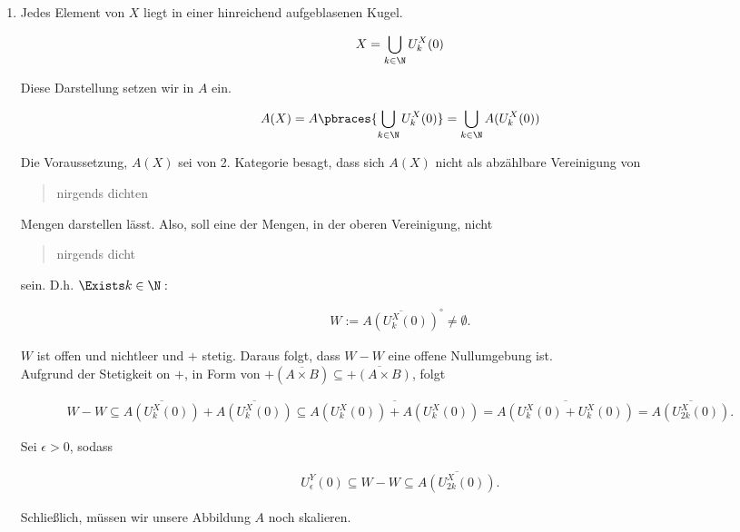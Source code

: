 \begin{solution}

\phantom{}

\begin{enumerate}[label = (\roman*)]

  \item
  Jedes Element von $X$ liegt in einer hinreichend aufgeblasenen Kugel.

  \begin{align*}
    X = \bigcup_{k \in \N} U_k^X(0)
  \end{align*}

  Diese Darstellung setzen wir in $A$ ein.

  \begin{align*}
    A(X)
    =
    A \pbraces
    {
      \bigcup_{k \in \N}
      U_k^X(0)
    }
    =
    \bigcup_{k \in \N}
    A(U_k^X(0))
  \end{align*}

  Die Voraussetzung, $A(X)$ sei von 2. Kategorie besagt, dass sich $A(X)$ nicht als abzählbare Vereinigung von \blockquote{nirgends dichten} Mengen darstellen lässt.
  Also, soll eine der Mengen, in der oberen Vereinigung, nicht \blockquote{nirgends dicht} sein.
  D.h. $\Exists k \in \N:$

  \begin{align*}
    W := \overline{A(U_k^X(0))}^\circ \neq \emptyset.
  \end{align*}

  $W$ ist offen und nichtleer und $+$ stetig.
  Daraus folgt, dass $W - W$ eine offene Nullumgebung ist. \\

  Aufgrund der Stetigkeit on $+$, in Form von $+(\overline{A \times B}) \subseteq \overline{+(A \times B)}$, folgt

  \begin{align*}
    W - W
    \subseteq
    \overline{A(U_k^X(0))} + \overline{A(U_k^X(0))}
    \subseteq
    \overline{A(U_k^X(0)) + A(U_k^X(0))}
    =
    \overline{A(U_k^X(0) + U_k^X(0))}
    =
    \overline{A(U_{2k}^X(0))}.
  \end{align*}

  Sei $\epsilon > 0$, sodass

  \begin{align*}
    U_{\epsilon}^Y(0)
    \subseteq
    W - W
    \subseteq
    \overline{A(U_{2k}^X(0))}.
  \end{align*}

  Schließlich, müssen wir unsere Abbildung $A$ noch skalieren.


\end{enumerate}
\end{solution}
